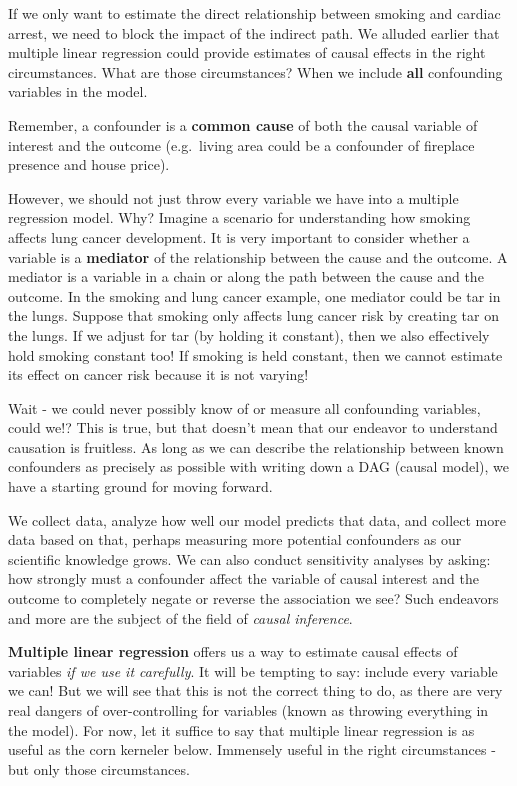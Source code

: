 \documentclass[
]{book}
\begin{document}
If we only want to estimate the direct relationship between smoking and cardiac arrest, we need to block the impact of the indirect path. We alluded earlier that multiple linear regression could provide estimates of causal effects in the right circumstances. What are those circumstances? When we include \textbf{all} confounding variables in the model.

Remember, a confounder is a \textbf{common cause} of both the causal variable of interest and the outcome (e.g.~living area could be a confounder of fireplace presence and house price).

However, we should not just throw every variable we have into a multiple regression model. Why? Imagine a scenario for understanding how smoking affects lung cancer development. It is very important to consider whether a variable is a \textbf{mediator} of the relationship between the cause and the outcome. A mediator is a variable in a chain or along the path between the cause and the outcome. In the smoking and lung cancer example, one mediator could be tar in the lungs. Suppose that smoking only affects lung cancer risk by creating tar on the lungs. If we adjust for tar (by holding it constant), then we also effectively hold smoking constant too! If smoking is held constant, then we cannot estimate its effect on cancer risk because it is not varying!

Wait - we could never possibly know of or measure all confounding variables, could we!? This is true, but that doesn't mean that our endeavor to understand causation is fruitless. As long as we can describe the relationship between known confounders as precisely as possible with writing down a DAG (causal model), we have a starting ground for moving forward.

We collect data, analyze how well our model predicts that data, and collect more data based on that, perhaps measuring more potential confounders as our scientific knowledge grows. We can also conduct sensitivity analyses by asking: how strongly must a confounder affect the variable of causal interest and the outcome to completely negate or reverse the association we see? Such endeavors and more are the subject of the field of \emph{causal inference}.

\textbf{Multiple linear regression} offers us a way to estimate causal effects of variables \emph{if we use it carefully}. It will be tempting to say: include every variable we can! But we will see that this is not the correct thing to do, as there are very real dangers of over-controlling for variables (known as throwing everything in the model). For now, let it suffice to say that multiple linear regression is as useful as the corn kerneler below. Immensely useful in the right circumstances - but only those circumstances.
\end{document}
